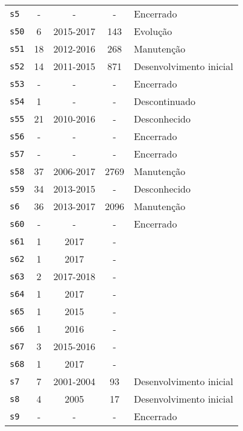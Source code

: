 \begin{longtable}{ l c c c l }
    \texttt{s5} & - & - & - & Encerrado \\
    \texttt{s50} & 6 & 2015-2017 & 143 & Evolução \\
    \texttt{s51} & 18 & 2012-2016 & 268 & Manutenção \\
    \texttt{s52} & 14 & 2011-2015 & 871 & Desenvolvimento inicial \\
    \texttt{s53} & - & - & - & Encerrado \\
    \texttt{s54} & 1 & - & - & Descontinuado \\
    \texttt{s55} & 21 & 2010-2016 & - & Desconhecido \\
    \texttt{s56} & - & - & - & Encerrado \\
    \texttt{s57} & - & - & - & Encerrado \\
    \texttt{s58} & 37 & 2006-2017 & 2769 & Manutenção \\
    \texttt{s59} & 34 & 2013-2015 & - & Desconhecido \\
    \texttt{s6} & 36 & 2013-2017 & 2096 & Manutenção \\
    \texttt{s60} & - & - & - & Encerrado \\
    \texttt{s61} & 1 & 2017 & - &  \\
    \texttt{s62} & 1 & 2017 & - &  \\
    \texttt{s63} & 2 & 2017-2018 & - &  \\
    \texttt{s64} & 1 & 2017 & - &  \\
    \texttt{s65} & 1 & 2015 & - &  \\
    \texttt{s66} & 1 & 2016 & - &  \\
    \texttt{s67} & 3 & 2015-2016 & - &  \\
    \texttt{s68} & 1 & 2017 & - &  \\
    \texttt{s7} & 7 & 2001-2004 & 93 & Desenvolvimento inicial \\
    \texttt{s8} & 4 & 2005 & 17 & Desenvolvimento inicial \\
    \texttt{s9} & - & - & - & Encerrado \\
\end{longtable}
